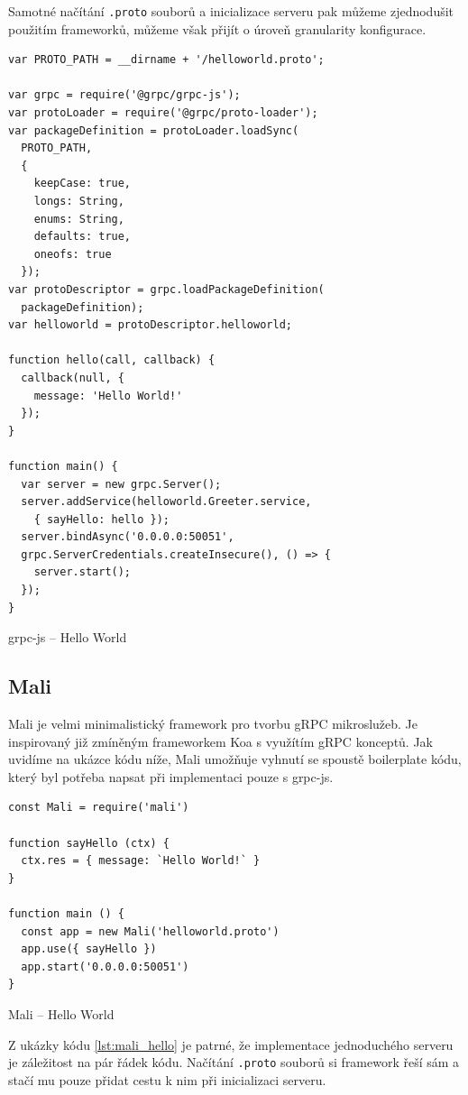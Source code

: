 \documentclass[thesis=M,czech]{FITthesis}[2019/12/23]
\begin{document}
Samotné načítání \texttt{.proto} souborů a inicializace serveru pak můžeme zjednodušit použitím frameworků, můžeme však přijít o úroveň granularity konfigurace.

\begin{listing}[H]
\begin{verbatim}
var PROTO_PATH = __dirname + '/helloworld.proto';

var grpc = require('@grpc/grpc-js');
var protoLoader = require('@grpc/proto-loader');
var packageDefinition = protoLoader.loadSync(
  PROTO_PATH,
  {
    keepCase: true,
    longs: String,
    enums: String,
    defaults: true,
    oneofs: true
  });
var protoDescriptor = grpc.loadPackageDefinition(
  packageDefinition);
var helloworld = protoDescriptor.helloworld;

function hello(call, callback) {
  callback(null, {
    message: 'Hello World!'
  });
}

function main() {
  var server = new grpc.Server();
  server.addService(helloworld.Greeter.service,
    { sayHello: hello });
  server.bindAsync('0.0.0.0:50051', 
  grpc.ServerCredentials.createInsecure(), () => {
    server.start();
  });
}
\end{verbatim}
\caption{grpc-js -- Hello World}
\label{lst:grpcjs_hello}
\end{listing}

\subsection{Mali}
Mali \cite{mali} je velmi minimalistický framework pro tvorbu gRPC mikroslužeb. Je inspirovaný již zmíněným frameworkem Koa s využítím gRPC konceptů. Jak uvidíme na ukázce kódu níže, Mali umožňuje vyhnutí se spoustě boilerplate kódu, který byl potřeba napsat při implementaci pouze s grpc-js.

\begin{listing}[H]
\begin{verbatim}
const Mali = require('mali')

function sayHello (ctx) {
  ctx.res = { message: `Hello World!` }
}

function main () {
  const app = new Mali('helloworld.proto')
  app.use({ sayHello })
  app.start('0.0.0.0:50051')
}
\end{verbatim}
\caption{Mali -- Hello World}
\label{lst:mali_hello}
\end{listing}

Z ukázky kódu \ref{lst:mali_hello} je patrné, že implementace jednoduchého serveru je záležitost na pár řádek kódu. Načítání \texttt{.proto} souborů si framework řeší sám a stačí mu pouze přidat cestu k nim při inicializaci serveru.
\end{document}

